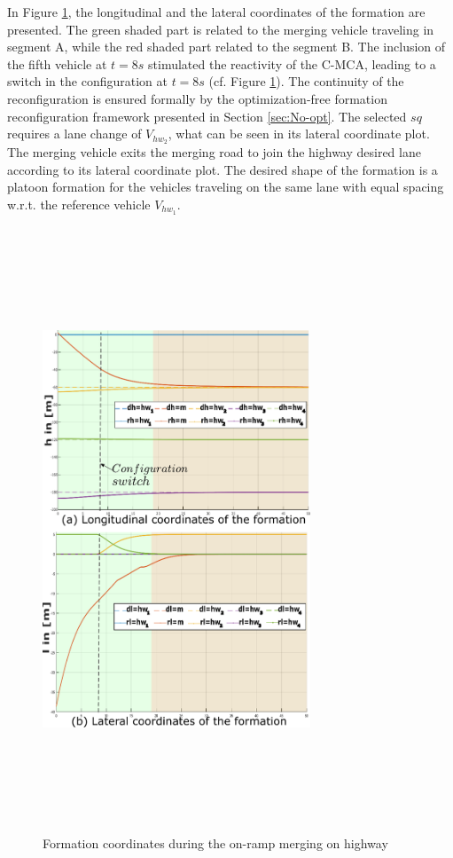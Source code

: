 In Figure \ref{fig:scenario02:formation_coordinates}, the longitudinal and the lateral coordinates of the formation are presented. The green shaded part is related to the merging vehicle traveling in segment A, while the red shaded part related to the segment B. The inclusion of the fifth vehicle at $t=8s$ stimulated the reactivity of the C-MCA, leading to a switch in the configuration at $t=8s$ (cf. Figure \ref{fig:scenario02:formation_coordinates}). The continuity of the reconfiguration is ensured formally by the optimization-free formation reconfiguration framework presented in Section \ref{sec:No-opt}. The selected $sq$ requires a lane change of $V_{hw_2}$, what can be seen in its lateral coordinate plot. The merging vehicle exits the merging road to join the highway desired lane according to its lateral coordinate plot. The desired shape of the formation is a platoon formation for the vehicles traveling on the same lane with equal spacing w.r.t. the reference vehicle $V_{hw_1}$. 



     \begin{figure}[!h]
        \centering 
        \includegraphics[width=8cm,height=18cm,keepaspectratio]{chapters/Chapitre_6/Figures/Scenario_2/coordi_s2.pdf}
        \caption{Formation coordinates during the on-ramp merging on highway}
        \label{fig:scenario02:formation_coordinates}
        \end{figure}




